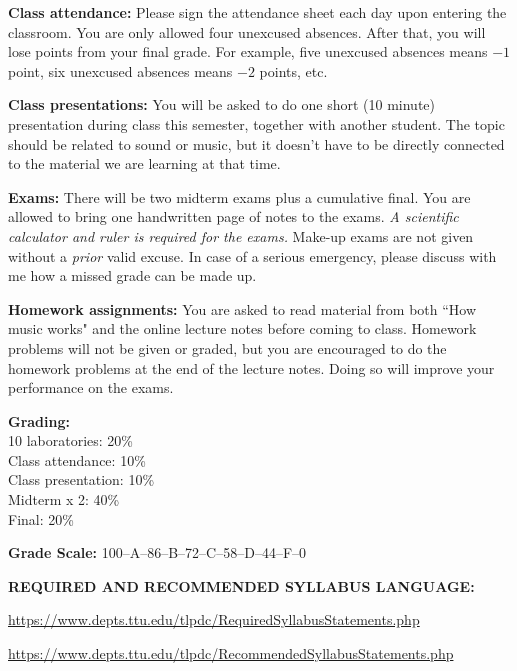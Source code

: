 \documentclass[11pt]{NSF}
\begin{document}
{\bf Class attendance:}
Please sign the attendance sheet each day upon entering 
the classroom.
You are only allowed four unexcused absences.
After that, you will lose points from your final grade.
For example, five unexcused absences means $-1$ point, six 
unexcused absences means $-2$ points, etc.
 
{\bf Class presentations:}
You will be asked to do one short (10 minute) presentation 
during class this semester, together with another student.
The topic should be related to sound or music, but it doesn't
have to be directly connected to the material we are learning
at that time.

{\bf Exams:}
There will be two midterm exams plus a cumulative final.
You are allowed to bring one handwritten page of notes to the exams.
{\em A scientific calculator and ruler is required for the exams.}
Make-up exams are not given without a {\em prior} valid excuse.
In case of a serious emergency, please discuss with me how a missed
grade can be made up.

{\bf Homework assignments:}
You are asked to read material from both ``How music works" and
the online lecture notes before coming to class.
Homework problems will not be given or graded, but you are
encouraged to do the homework problems at the end of the lecture notes.
Doing so will improve your performance on the exams.

{\bf Grading:}\\
10 laboratories: 20\%\\
Class attendance: 10\%\\
Class presentation: 10\%\\
Midterm x 2: 40\%\\
Final: 20\%

{\bf Grade Scale:} 100--A--86--B--72--C--58--D--44--F--0
 
{\bf REQUIRED AND RECOMMENDED SYLLABUS LANGUAGE:}

\url{https://www.depts.ttu.edu/tlpdc/RequiredSyllabusStatements.php}

\url{https://www.depts.ttu.edu/tlpdc/RecommendedSyllabusStatements.php}
\end{document}

